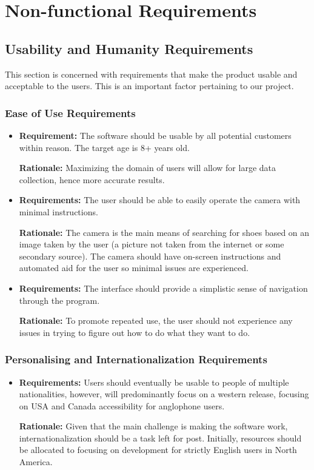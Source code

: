 \documentclass[12pt, titlepage]{article}
\begin{document}
\section{Non-functional Requirements}

\subsection{Usability and Humanity Requirements}
This section is concerned with requirements that make the product usable and acceptable to the users. This is an important factor pertaining to our project.

\subsubsection{Ease of Use Requirements}
\begin{itemize}{}
    \item \textbf{Requirement:} The software should be usable by all potential customers within reason. The target age is 8+ years old.
    
    \textbf{Rationale:} Maximizing the domain of users will allow for large data collection, hence more accurate results.
    
    \item \textbf{Requirements:} The user should be able to easily operate the camera with minimal instructions.
    
    \textbf{Rationale:} The camera is the main means of searching for shoes based on an image taken by the user (a picture not taken from the internet or some secondary source). The camera should have on-screen instructions and automated aid for the user so minimal issues are experienced.
    
    \item \textbf{Requirements:} The interface should provide a simplistic sense of navigation through the program.
    
    \textbf{Rationale:} To promote repeated use, the user should not experience any issues in trying to figure out how to do what they want to do.
\end{itemize}

\subsubsection{Personalising and Internationalization Requirements}
\begin{itemize}
    \item\textbf{Requirements:} Users should eventually be usable to people of multiple nationalities, however, will predominantly focus on a western release, focusing on USA and Canada accessibility for anglophone users.
    
    \textbf{Rationale:} Given that the main challenge is making the software work, internationalization should be a task left for post. Initially, resources should be allocated to focusing on development for strictly English users in North America.
\end{itemize}
\end{document}
